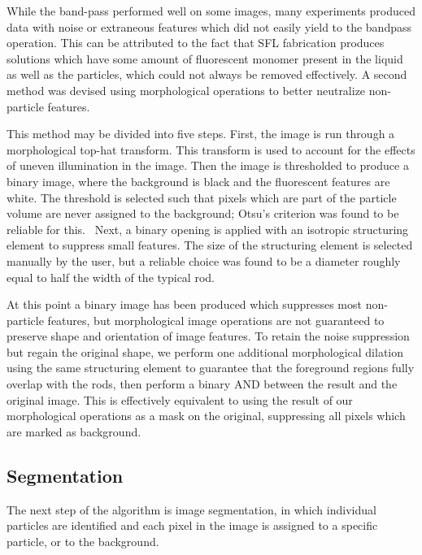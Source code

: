 While the band-pass performed well on some images, many experiments produced data with noise or
extraneous features which did
not easily yield to the bandpass operation. This can be attributed to the fact that SFL fabrication produces
solutions which have some amount of fluorescent monomer present in the liquid as well as the particles, which
could not always be removed effectively.  A second method was devised using morphological
operations to better neutralize non-particle features.

This method may be divided into five steps. First, the 
image is run through a morphological top-hat transform. This transform is used to account for the effects of
uneven illumination in the image. Then the image is thresholded to produce a binary image, where the 
background is black and the fluorescent features are white. The threshold is selected such that pixels which 
are part of the particle volume are never assigned to the background; Otsu's criterion was found to be reliable
for this.~\cite{otsu-threshold}  Next, a binary opening is applied with an isotropic structuring element to
suppress small features. The size of the structuring element is selected manually by the user, but a 
reliable choice was found to be a diameter roughly equal to half the width of the typical rod. 

At this point a binary image has been produced which suppresses most non-particle features, but morphological
image operations are not guaranteed to preserve shape and orientation of image features.  To retain the noise suppression
but regain the original shape, we perform one additional morphological dilation using the same structuring element to
guarantee that the foreground regions fully overlap with the rods, then perform a binary AND between the result and the
original image. This is effectively equivalent to using the result of our morphological operations as a mask on
the original, suppressing
all pixels which are marked as background.

\subsection{Segmentation}

The next step of the algorithm is image segmentation, in which individual particles are identified and each pixel
in the image is assigned to a specific particle, or to the background. 


